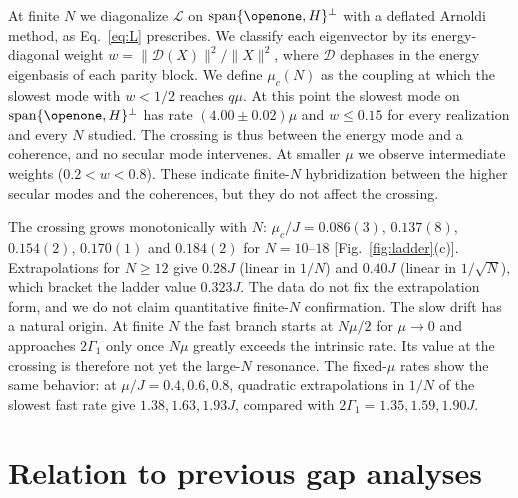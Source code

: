 \documentclass[aps,pre,twocolumn,superscriptaddress,amsmath,amssymb,10pt]{revtex4-2}
\newcommand{\Lc}{\mathcal{L}}
\begin{document}
At finite $N$ we diagonalize $\Lc$ on $\mathrm{span}\{\openone,H\}^\perp$ with a deflated Arnoldi method, as Eq.~\eqref{eq:L} prescribes. We classify each eigenvector by its energy-diagonal weight $w=\|\mathcal D(X)\|^2/\|X\|^2$, where $\mathcal D$ dephases in the energy eigenbasis of each parity block. We define $\mu_c(N)$ as the coupling at which the slowest mode with $w<1/2$ reaches $q\mu$. At this point the slowest mode on $\mathrm{span}\{\openone,H\}^\perp$ has rate $(4.00\pm0.02)\mu$ and $w\le0.15$ for every realization and every $N$ studied. The crossing is thus between the energy mode and a coherence, and no secular mode intervenes. At smaller $\mu$ we observe intermediate weights ($0.2<w<0.8$). These indicate finite-$N$ hybridization between the higher secular modes and the coherences, but they do not affect the crossing.

The crossing grows monotonically with $N$: $\mu_c/J=0.086(3)$, $0.137(8)$, $0.154(2)$, $0.170(1)$ and $0.184(2)$ for $N=10$--$18$ [Fig.~\ref{fig:ladder}(c)]. Extrapolations for $N\ge12$ give $0.28J$ (linear in $1/N$) and $0.40J$ (linear in $1/\sqrt N$), which bracket the ladder value $0.323J$. The data do not fix the extrapolation form, and we do not claim quantitative finite-$N$ confirmation. The slow drift has a natural origin. At finite $N$ the fast branch starts at $N\mu/2$ for $\mu\to0$ and approaches $2\Gamma_1$ only once $N\mu$ greatly exceeds the intrinsic rate. Its value at the crossing is therefore not yet the large-$N$ resonance. The fixed-$\mu$ rates show the same behavior: at $\mu/J=0.4,0.6,0.8$, quadratic extrapolations in $1/N$ of the slowest fast rate give $1.38,1.63,1.93J$, compared with $2\Gamma_1=1.35,1.59,1.90J$.

\section{Relation to previous gap analyses}
\end{document}
